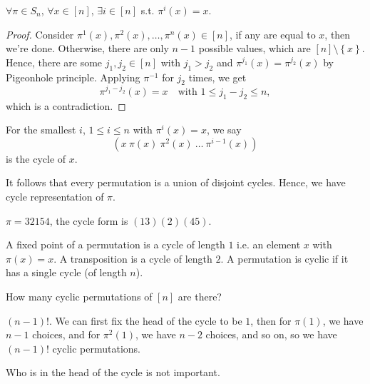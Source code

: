 \begin{claim}
    \(\forall \pi \in S_n\), \(\forall x \in [n]\), \(\exists i \in [n]\) s.t. \(\pi ^i (x) = x\).    
\end{claim}
\begin{proof}
    Consider \(\pi ^1(x), \pi ^2(x) ,\dots , \pi ^n(x) \in [n]\), if any are equal to \(x\), then we're done. Otherwise, there are only \(n - 1\) possible values, which are \([n]\setminus \left\{ x \right\} \). Hence, there are some \(j_1, j_2 \in [n]\) with \(j_1 > j_2\) and \(\pi ^{j_1}(x) = \pi ^{j_2}(x)\) by Pigeonhole principle. Applying \(\pi ^{-1}\) for \(j_2\) times, we get 
    \[
        \pi ^{j_1 - j_2}(x) = x \quad \text{with } 1 \le j_1 - j_2 \le n,
    \] which is a contradiction.
\end{proof}

\begin{definition}[cycle]
    For the smallest \(i\), \(1 \le i \le n\) with \(\pi ^i (x) =x\), we say 
    \[
        (x \ \pi (x) \ \pi ^2(x) \ \dots \ \pi ^{i-1}(x))
    \] is the cycle of \(x\).   
\end{definition}

It follows that every permutation is a union of disjoint cycles. Hence, we have cycle representation of \(\pi \). 

\begin{eg}
    \(\pi = 32154\), the cycle form is \((13)(2)(45)\).  
\end{eg}

\begin{definition}
    A fixed point of a permutation is a cycle of length \(1\) i.e. an element \(x\) with \(\pi (x) = x\). A transposition is a cycle of length \(2\). A permutation is cyclic if it has a single cycle (of length \(n\)).
\end{definition}

\begin{question}
    How many cyclic permutations of \([n]\) are there? 
\end{question}
\begin{answer}
    \((n-1)!\). We can first fix the head of the cycle to be \(1\), then for \(\pi (1)\), we have \(n-1\) choices, and for \(\pi ^2(1)\), we have \(n - 2\) choices, and so on, so we have \((n-1)!\) cyclic permutations. 
    \begin{note}
        Who is in the head of the cycle is not important.
    \end{note}     
\end{answer}

